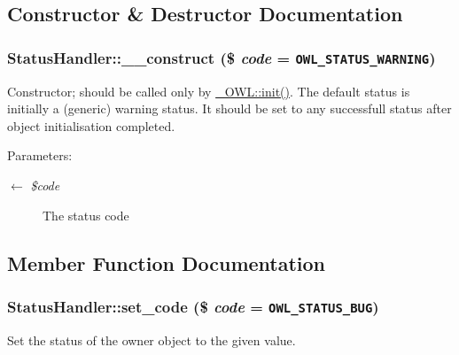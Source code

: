 \subsection{Constructor \& Destructor Documentation}
\hypertarget{classStatusHandler_5cb2ad461aa4afc7ec9115c176eb354e}{
\subsubsection{\setlength{\rightskip}{0pt plus 5cm}StatusHandler::\_\-\_\-construct (\$ {\em code} = {\tt OWL\_\-STATUS\_\-WARNING})}}
\label{classStatusHandler_5cb2ad461aa4afc7ec9115c176eb354e}


Constructor; should be called only by \hyperlink{class__OWL_e0ef3ded56e8a6b34b6461e5a721cd3e}{\_\-OWL::init()}. The default status is initially a (generic) warning status. It should be set to any successfull status after object initialisation completed.

\begin{Desc}
\item[Parameters:]
\begin{description}
\item[\mbox{$\leftarrow$} {\em \$code}]The status code \end{description}
\end{Desc}


\subsection{Member Function Documentation}
\hypertarget{classStatusHandler_748d462386322a552aa798f951258c91}{
\subsubsection{\setlength{\rightskip}{0pt plus 5cm}StatusHandler::set\_\-code (\$ {\em code} = {\tt OWL\_\-STATUS\_\-BUG})}}
\label{classStatusHandler_748d462386322a552aa798f951258c91}


Set the status of the owner object to the given value.

